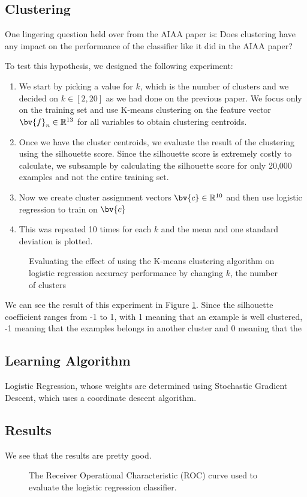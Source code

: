 \subsection{Clustering}

One lingering question held over from the AIAA paper is: Does
clustering have any impact on the performance of the classifier like
it did in the AIAA paper?

To test this hypothesis, we designed the following experiment:

\begin{enumerate}
\item  We start by picking a value for $k$, which is the number of
  clusters and we decided on $k \in [2,20]$ as we had done on the
  previous paper. We focus only on the training set and use K-means
  clustering on the feature vector $\bv{f}_n \in \mathbb{R}^{13}$ for
  all variables to obtain clustering centroids.
\item Once we have the cluster centroids, we evaluate the result of
  the clustering using the silhouette score. Since the silhouette
  score is extremely costly to calculate, we subsample by calculating
  the silhouette score for only 20,000 examples and not the entire
  training set. 
\item Now we create cluster assignment vectors $\bv{c} \in
  \mathbb{R}^{10}$ and then use logistic regression to train on $\bv{c}$
\item This was repeated 10 times for each $k$ and the mean and one
  standard deviation is plotted.
\end{enumerate}

\begin{figure}[h]
  \caption{Evaluating the effect of using the K-means clustering
    algorithm on logistic regression accuracy performance by changing
    $k$, the number of clusters}
  \label{fig:kmeansclustering}
\end{figure}

We can see the result of this experiment in Figure
\ref{fig:kmeansclustering}. Since the silhouette coefficient ranges
from -1 to 1, with 1 meaning that an example is well clustered, -1
meaning that the examples belongs in another cluster and 0 meaning
that the 

\subsection{Learning Algorithm}

Logistic Regression, whose weights are determined using Stochastic
Gradient Descent, which uses a coordinate descent algorithm.

\subsection{Results}

We see that the results are pretty good.

\begin{figure}[h]
  \caption{The Receiver Operational Characteristic (ROC) curve used to
    evaluate the logistic regression classifier. }
  \label{fig:logregroc}
\end{figure}
